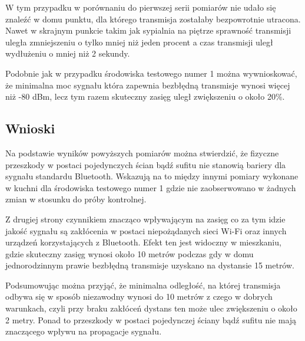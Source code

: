 \documentclass[12pt, twoside, openany]{mwrep}
\begin{document}
W tym przypadku w porównaniu do pierwszej serii pomiarów nie udało się znaleźć w domu punktu, dla którego transmisja zostałaby bezpowrotnie utracona. Nawet w skrajnym punkcie takim jak sypialnia na piętrze sprawność transmisji uległa zmniejszeniu o tylko mniej niż jeden procent a czas transmisji uległ wydłużeniu o mniej niż 2 sekundy. 
\par
Podobnie jak w przypadku środowiska testowego numer 1 można wywnioskować, że minimalna moc sygnału która zapewnia bezbłędną transmisje wynosi więcej niż -80 dBm, lecz tym razem skuteczny zasięg uległ zwiększeniu o około 20\%. 

\subsection{Wnioski}

Na podstawie wyników powyższych pomiarów można stwierdzić, że fizyczne przeszkody w postaci pojedynczych ścian bądź sufitu nie stanowią bariery dla sygnału standardu Bluetooth. Wskazują na to między innymi pomiary wykonane w kuchni dla środowiska testowego numer 1 gdzie nie zaobserwowano w żadnych zmian w stosunku do próby kontrolnej.
\par
Z drugiej strony czynnikiem znacząco wpływającym na zasięg co za tym idzie jakość sygnału są zakłócenia w postaci niepożądanych sieci Wi-Fi oraz innych urządzeń korzystających z Bluetooth. Efekt ten jest widoczny w mieszkaniu, gdzie skuteczny zasięg wynosi około 10 metrów podczas gdy w domu jednorodzinnym prawie bezbłędną transmisje uzyskano na dystansie 15 metrów. 
\par
Podsumowując można przyjąć, że minimalna odległość, na której transmisja odbywa się w sposób niezawodny wynosi do 10 metrów z czego w dobrych warunkach, czyli przy braku zakłóceń dystans ten może ulec zwiększeniu o około 2 metry. Ponad to przeszkody w postaci pojedynczej ściany bądź sufitu nie mają znaczącego wpływu na propagacje sygnału.


\end{document}
